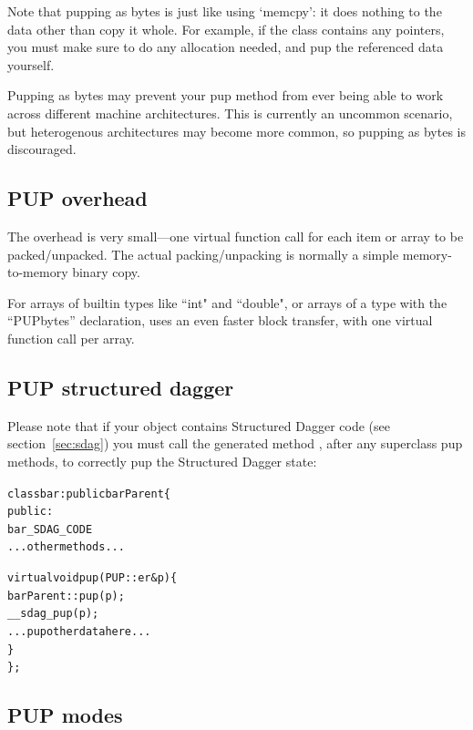Note that pupping as bytes is just like using `memcpy': 
it does nothing to the data other than copy it whole.
For example, if the class contains any pointers, you
must make sure to do any allocation needed, and
pup the referenced data yourself.

Pupping as bytes may prevent your pup method from ever being able to
work across different machine architectures.  This is currently
an uncommon scenario, but heterogenous architectures may become more
common, so pupping as bytes is discouraged.

\subsection{PUP overhead}

\label{sec:pupoverhead}

The  overhead is very small---one virtual function call
for each item or array to be packed/unpacked.  The actual packing/unpacking is
normally a simple memory-to-memory binary copy. 

For arrays of builtin types like ``int" and ``double", or arrays of a type 
with the ``PUPbytes'' declaration,  uses an even faster block 
transfer, with one virtual function call per array.


\subsection{PUP structured dagger}

\label{sec:pupsdag}

Please note that if your object contains Structured Dagger code (see section~\ref{sec:sdag}) you must call the generated method , after any superclass pup methods, to correctly pup the Structured Dagger state:

\begin{alltt}
class bar : public barParent \{
 public:
    bar_SDAG_CODE 
    ...other methods...

    virtual void pup(PUP::er& p) \{
      barParent::pup(p);
      __sdag_pup(p);
      ...pup other data here...
    \}
\};
\end{alltt}



\subsection{PUP modes}

\label{sec:pupmodes}


